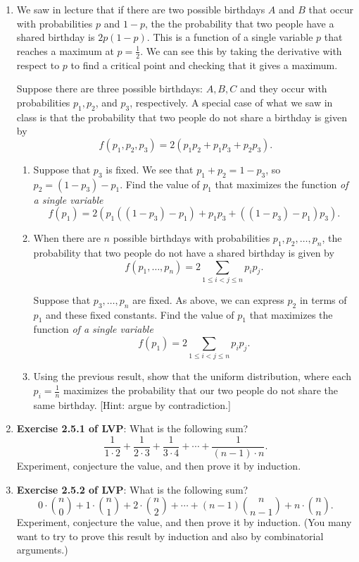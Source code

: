 \documentclass[11pt]{article}
\begin{document}
\begin{enumerate}

\item We saw in lecture that if there are two possible birthdays $A$ and $B$  that occur with probabilities $p$ and $1-p$, the the probability that two people have a shared birthday is $2 p(1-p)$.  This is a function of a single variable $p$ that reaches a maximum at $p = \frac{1}{2}$.  We can see this by taking the derivative with respect to $p$ to find a critical point and checking that it gives a maximum.

Suppose there are three possible birthdays: $A,B,C$ and they occur with probabilities $p_1, p_2$, and $p_3$, respectively.  A special case of what we saw in class is that the probability that two people do not share a birthday is given by
\[
f(p_1, p_2, p_3) = 2\left(p_1 p_2 + p_1 p_3 + p_2 p_3\right).
\]
\begin{enumerate}
\item Suppose that $p_3$ is fixed.  We see that $p_1 + p_2 = 1-p_3$, so $p_2 = (1-p_3) - p_1$.  Find the value of $p_1$ that maximizes the function \emph{of a single variable}
\[
f(p_1) = 2 \left(p_1 ((1-p_3) - p_1) + p_1 p_3 + ((1-p_3) - p_1) p_3\right).
\]

\item When there are $n$ possible birthdays with probabilities $p_1,p_2,\ldots, p_n$, the probability that two people do not have a shared birthday is given by
\[
f(p_1,\ldots, p_n) = 2 \sum_{1\le i < j \le n} p_i p_j.
\]

Suppose that $p_3,\ldots, p_n$ are fixed.  As above, we can express $p_2$ in terms of $p_1$ and these fixed constants.  Find the value of $p_1$ that maximizes the function \emph{of a single variable}
\[
f(p_1) = 2 \sum_{1\le i < j \le n} p_i p_j.
\]

\item Using the previous result, show that the uniform distribution, where each $p_i = \frac{1}{n}$ maximizes the probability that our two people do not share the same birthday. [Hint: argue by contradiction.]

\end{enumerate}

\item {\bf Exercise 2.5.1 of LVP}: What is the following sum?
\[
\frac{1}{1\cdot 2}+\frac{1}{2\cdot 3} +\frac{1}{3\cdot 4} + \cdots + \frac{1}{(n-1)\cdot n}.
\]
Experiment, conjecture the value, and then prove it by induction.

\item {\bf Exercise 2.5.2 of LVP}: What is the following sum?
\[
0\cdot \binom{n}{0} + 1 \cdot \binom{n}{1} + 2\cdot \binom{n}{2} + \cdots + (n-1) \binom{n}{n-1} + n \cdot \binom{n}{n}.
\]
Experiment, conjecture the value, and then prove it by induction.  (You many want to try to prove this result by induction and also by combinatorial arguments.)


\end{enumerate}
\end{document}
